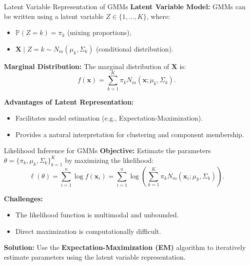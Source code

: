 \documentclass[11pt,handout,aspectratio=169]{beamer}
\begin{document}
\begin{frame}{Latent Variable Representation of GMMs}
\textbf{Latent Variable Model:}
GMMs can be written using a latent variable \( Z \in \{1, \dots, K\} \), where:
\begin{itemize}
    \item \( \mathbb{P}(Z = k) = \pi_k \) (mixing proportions),
    \item \( \mathbf{X} \mid Z = k \sim N_m(\mu_k, \Sigma_k) \) (conditional distribution).
\end{itemize}

\textbf{Marginal Distribution:}
The marginal distribution of \( \mathbf{X} \) is:
\[
f(\mathbf{x}) = \sum_{k=1}^K \pi_k N_m(\mathbf{x}; \mu_k, \Sigma_k).
\]

\textbf{Advantages of Latent Representation:}
\begin{itemize}
    \item Facilitates model estimation (e.g., Expectation-Maximization).
    \item Provides a natural interpretation for clustering and component membership.
\end{itemize}
\end{frame}

\begin{frame}{Likelihood Inference for GMMs}
\textbf{Objective:} Estimate the parameters \( \theta = \{ \pi_k, \mu_k, \Sigma_k \}_{k=1}^K \) by maximizing the likelihood:
\[
\ell(\theta) = \sum_{i=1}^n \log f(\mathbf{x}_i) = \sum_{i=1}^n \log \left( \sum_{k=1}^K \pi_k N_m(\mathbf{x}_i; \mu_k, \Sigma_k) \right).
\]

\textbf{Challenges:}
\begin{itemize}
    \item The likelihood function is multimodal and unbounded.
    \item Direct maximization is computationally difficult.
\end{itemize}

\textbf{Solution:} Use the \textbf{Expectation-Maximization (EM)} algorithm to iteratively estimate parameters using the latent variable representation.
\end{frame}
\end{document}
